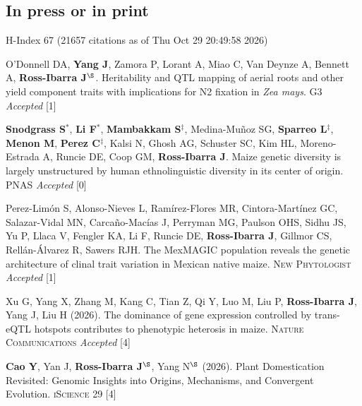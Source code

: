 \documentclass[letterpaper,10pt]{article}
\begin{document}
\subsection*{In press or in print} %
 {\small H-Index 67 (21657 citations as of Thu Oct 29 20:49:58 2026)}

\begin{etaremune}
\setlength\itemsep{0ex}
\item O'Donnell DA, \textbf{Yang J}, Zamora P, Lorant A, Miao C, Van Deynze A, Bennett A, \textbf{Ross-Ibarra J}$^\S$. Heritability and QTL mapping of aerial roots and other yield component traits with implications for N2 fixation in \textit{Zea mays}. \textsc{G3} \textit{Accepted} %
{} [1]\\

\item \textbf{Snodgrass S}$^*$, \textbf{Li F}$^*$, \textbf{Mambakkam S}$^\ddagger$, Medina-Mu\~noz SG, \textbf{Sparreo L}$^\ddagger$, \textbf{Menon M}, \textbf{Perez C}$^\ddagger$, Kalsi N, Ghosh AG, Schuster SC, Kim HL, Moreno-Estrada A, Runcie DE, Coop GM, \textbf{Ross-Ibarra J}. Maize genetic diversity is largely unstructured by human ethnolinguistic diversity in its center of origin.  \textsc{PNAS} \textit{Accepted}  
{} [0]\\

\item Perez-Lim\'on S, Alonso-Nieves L, Ram\'irez-Flores MR, Cintora-Mart\'inez GC, Salazar-Vidal MN, Carca\~no-Mac\'ias J, Perryman MG, Paulson OHS, Sidhu JS, Yu P, Llaca V, Fengler KA, Li F, Runcie DE, \textbf{Ross-Ibarra J}, Gillmor CS, Rell\'an-\'Alvarez R, Sawers RJH. The MexMAGIC population reveals the genetic architecture of clinal trait variation in Mexican native maize. \textsc{New Phytologist} \textit{Accepted} %
{} [1]\\

\item Xu G, Yang X, Zhang M, Kang C, Tian Z, Qi Y, Luo M, Liu P, \textbf{Ross-Ibarra J}, Yang J, Liu H (2026). The dominance of gene expression controlled by trans-eQTL hotspots contributes to phenotypic heterosis in maize. \textsc{Nature Communications} \textit{Accepted} %
{} [4]\\

\item \textbf{Cao Y}, Yan J, \textbf{Ross-Ibarra J}$^\S$, Yang N$^\S$ (2026). Plant Domestication Revisited: Genomic Insights into Origins, Mechanisms, and Convergent Evolution. \textsc{iScience} 29 %
{} [4]\\


\end{etaremune}
\end{document}
